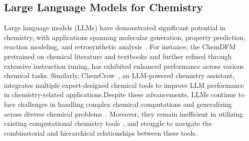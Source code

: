 \subsection{Large Language Models for Chemistry}

Large language models (LLMs) have demonstrated significant potential in chemistry, with applications spanning molecular generation, property prediction, reaction modeling, and retrosynthetic analysis~\cite{fang2024molinstructionslargescalebiomolecularinstruction,tang2024prioritizingsafeguardingautonomyrisks,liao2024wordsmoleculessurveylarge}. For instance, the ChemDFM ~\cite{zhao2024chemdfmlargelanguagefoundation} pretrained on chemical literature and textbooks and further refined through extensive instruction tuning, has exhibited enhanced performance across various chemical tasks. Similarly, ChemCrow~\cite{bran2023chemcrowaugmentinglargelanguagemodels}, an LLM-powered chemistry assistant, integrates multiple expert-designed chemical tools to improve LLM performance in chemistry-related applications.Despite these advancements, LLMs continue to face challenges in handling complex chemical computations and generalizing across diverse chemical problems~\cite{ouyang2024structuredchemistryreasoninglarge,han2024generalistspecialistsurveylarge}. Moreover, they remain inefficient in utilizing existing computational chemistry tools~\cite{shi2023relmleveraginglanguagemodels}, and struggle to navigate the combinatorial and hierarchical relationships between these tools.

